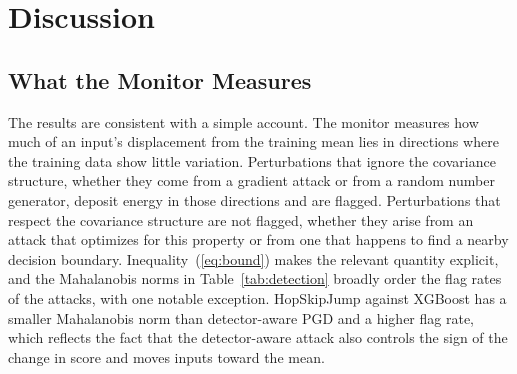 \documentclass[preprint,12pt,authoryear]{elsarticle}
\begin{document}
\begin{table}[!htbp]
\centering
\caption{XGBoost under perturbations not crafted against it, with and without Gaussian oversampling on unstandardized features (mean $\pm$ SD over 50 folds).}
\label{tab:transfer}
\small\setlength{\tabcolsep}{4pt}
\end{table}

\section{Discussion}
\label{sec:discussion}

\subsection{What the Monitor Measures}
The results are consistent with a simple account. The monitor measures how much of an input's displacement from the training mean lies in directions where the training data show little variation. Perturbations that ignore the covariance structure, whether they come from a gradient attack or from a random number generator, deposit energy in those directions and are flagged. Perturbations that respect the covariance structure are not flagged, whether they arise from an attack that optimizes for this property or from one that happens to find a nearby decision boundary. Inequality~(\ref{eq:bound}) makes the relevant quantity explicit, and the Mahalanobis norms in Table~\ref{tab:detection} broadly order the flag rates of the attacks, with one notable exception. HopSkipJump against XGBoost has a smaller Mahalanobis norm than detector-aware PGD and a higher flag rate, which reflects the fact that the detector-aware attack also controls the sign of the change in score and moves inputs toward the mean.
\end{document}
